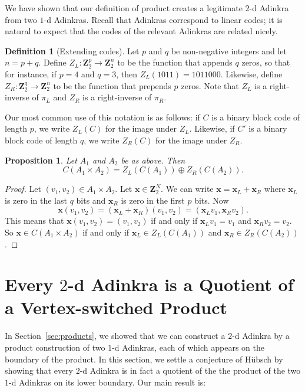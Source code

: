 \documentclass[12pt,twoside,singlespace]{article}
\numberwithin{equation}{section}
\newtheorem{prop}[equation]{Proposition}
\theoremstyle{definition}
\newtheorem{definition}[equation]{Definition}
\newcommand{\ZZ}{\mathbf{Z}}
\renewcommand{\vec}[1]{\mathbf{#1}}
\begin{document}
We have shown that our definition of product creates a legitimate $2$-d Adinkra from two $1$-d Adinkras. Recall that Adinkras correspond to linear codes; it is natural to expect that the codes of the relevant Adinkras are related nicely.

\begin{definition}[Extending codes]
Let $p$ and $q$ be non-negative integers and let $n=p+q$.  Define $Z_L:\ZZ_2^p\to\ZZ_2^n$ to be the function that appends $q$ zeros, so that for instance, if $p=4$ and $q=3$, then $Z_L(1011)=1011000$.  Likewise, define $Z_R:\ZZ_2^q\to\ZZ_2^n$ to be the function that prepends $p$ zeros.  Note that $Z_L$ is a right-inverse of $\pi_L$ and $Z_R$ is a right-inverse of $\pi_R$.

Our most common use of this notation is as follows: if $C$ is a binary block code of length $p$, we write $Z_L(C)$ for the image under $Z_L$.  Likewise, if $C'$ is a binary block code of length $q$, we write $Z_R(C)$ for the image under $Z_R$.
\end{definition}

\begin{prop}
Let $A_1$ and $A_2$ be as above.  Then
\[C(A_1\times A_2)=Z_L(C(A_1))\oplus Z_R(C(A_2)).\]
\end{prop}
\begin{proof}
Let $(v_1,v_2)\in A_1\times A_2$.  Let $\vec{x}\in \ZZ_2^N$.  We can write $\vec{x}=\vec{x}_L+\vec{x}_R$ where $\vec{x}_L$ is zero in the last $q$ bits and $\vec{x}_R$ is zero in the first $p$ bits.  Now
\[\vec{x}(v_1,v_2)=(\vec{x}_L+\vec{x}_R)(v_1,v_2)=(\vec{x}_Lv_1,\vec{x}_Rv_2).\]
This means that $\vec{x}(v_1,v_2)=(v_1,v_2)$ if and only if $\vec{x}_Lv_1=v_1$ and $\vec{x}_R v_2=v_2$. So $\vec{x}\in C(A_1\times A_2)$ if and only if $\vec{x}_L\in Z_L(C(A_1))$ and $\vec{x}_R\in Z_R(C(A_2))$.
\end{proof}





\section{Every $2$-d Adinkra is a Quotient of a Vertex-switched Product}
\label{sec:quotient}

In Section~\ref{sec:products}, we showed that we can construct a $2$-d Adinkra by a product construction of two $1$-d Adinkras, each of which appears on the boundary of the product. In this section, we settle a conjecture of H\"ubsch \cite{hubsch:weaving} by showing that every $2$-d Adinkra is in fact a quotient of the the product of the two $1$-d Adinkras on its lower boundary. Our main result is:
\end{document}
